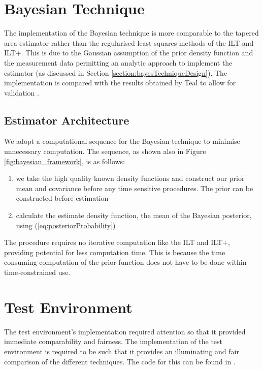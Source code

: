 \section{Bayesian Technique}
The implementation of the Bayesian technique is more comparable to the tapered area estimator rather than the regularised least squares methods of the ILT and ILT+. This is due to the Gaussian assumption of the prior density function and the measurement data permitting an analytic approach to implement the estimator (as discussed in Section \ref{section:bayesTechniqueDesign}). The implementation is compared with the results obtained by Teal to allow for validation \cite{paulTeal_NMRBayes}.

\subsection{Estimator Architecture}
We adopt a computational sequence for the Bayesian technique to minimise unnecessary computation. The sequence, as shown also in Figure \ref{fig:bayesian_framework}, is as follows:
\begin{enumerate}
    \item we take the high quality known density functions and construct our prior mean and covariance before any time sensitive procedures. The prior can be constructed before estimation
    \item calculate the estimate density function, the mean of the Bayesian posterior, using (\ref{eq:posteriorProbability})
\end{enumerate}


The procedure requires no iterative computation like the ILT and ILT+, providing potential for less computation time. This is because the time consuming computation of the prior function does not have to be done within time-constrained use.






\section{Test Environment}
The test environment's implementation required attention so that it provided immediate comparability and fairness. The implementation of the test environment is required to be such that it provides an illuminating and fair comparison of the different techniques. The code for this can be found in \cite{dobbie_2018_test_Env}.


